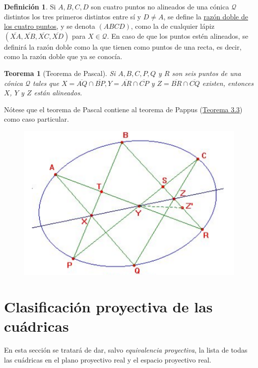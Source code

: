 \documentclass[12pt]{report}
\newtheorem{theorem}{Teorema}[chapter]
\theoremstyle{definition}
\newtheorem{definition}{Definición}[chapter]
\theoremstyle{definition}
\theoremstyle{remark}
\begin{document}
\begin{definition}
Si $A,B,C,D$ son cuatro puntos no alineados de una cónica $\mathcal{Q}$ distintos los tres primeros distintos entre sí y $D \neq A$, se define la \ul{razón doble de los cuatro puntos}, y se denota $(ABCD)$, como la de cualquier lápiz $(\overline{XA}, \overline{XB}, \overline{XC}, \overline{XD})$ para $X \in \mathcal{Q}$. En caso de que los puntos estén alineados, se definirá la razón doble como la que tienen como puntos de una recta, es decir, como la razón doble que ya se conocía.
\end{definition}

\begin{theorem}[Teorema de Pascal]
Si $A,B,C,P,Q$ y $R$ son seis puntos de una cónica $\mathcal{Q}$ tales que $X = \overline{AQ} \cap \overline{BP}, Y = \overline{AR} \cap \overline{CP}$ y $Z = \overline{BR} \cap \overline{CQ}$ existen, entonces $X$, $ Y$ y $Z$ están alineados.
\end{theorem}

Nótese que el teorema de Pascal contiene al teorema de Pappus (\hyperref[teo3.3.]{\color{blue}Teorema 3.3}) como caso particular.

\begin{figure}[h]
\includegraphics[scale = 0.6]{5.7_1}
\centering
\end{figure}

\section{Clasificación proyectiva de las cuádricas}

En esta sección se tratará de dar, salvo \textit{equivalencia proyectiva}, la lista de todas las cuádricas en el plano proyectivo real y el espacio proyectivo real.
\end{document}
